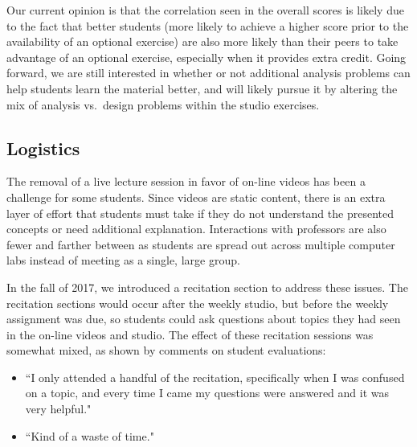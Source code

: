 Our current opinion is that the correlation seen in the overall scores
is likely due to the
fact that better students (more likely to achieve a higher score prior
to the availability of an optional exercise) are also more likely than
their peers to take advantage of an optional exercise, especially when
it provides extra credit.
Going forward, we are still interested in whether or not additional
analysis problems can help students learn the material better, and will
likely pursue it by altering the mix of analysis vs.~design problems
within the studio exercises.

\subsection{Logistics}


The removal of a live lecture session in favor of on-line videos has been
a challenge for some students. Since videos are static content, there is an
extra layer of effort that students must take if they do not understand the
presented concepts or need additional explanation. Interactions with professors
are also fewer and farther between as students are spread out across multiple
computer labs instead of meeting as a single, large group.

In the fall of 2017, we introduced a recitation section to address these issues.
The recitation sections would occur after the weekly studio, but before the weekly
assignment was due, so students could ask questions about topics they had
seen in the on-line videos and studio. The effect of these recitation sessions
was somewhat mixed, as shown by comments on student evaluations:
\begin{itemize}
\item ``I only attended a handful of the recitation, specifically when I was
confused on a topic, and every time I came my questions were answered and
it was very helpful."
\item ``Kind of a waste of time."
\end{itemize}

